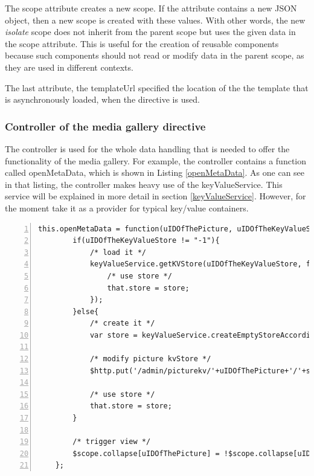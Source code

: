 The scope attribute creates a new scope. If the attribute contains a new \ac{JSON} object, then a new scope is created with these values. With other words, the new \emph{isolate} scope does not inherit from the parent scope but uses the given data in the scope attribute. This is useful for the creation of reusable components because such components should not  read or modify data in the parent scope, as they are used in different contexts. 

The last attribute, the templateUrl specified the location of the the template that is asynchronously loaded, when the directive is used.

\subsubsection{Controller of the media gallery directive}
The controller is used for the whole data handling that is needed to offer the functionality of the media gallery. For example, the controller contains a function called openMetaData, which is shown in Listing \ref{openMetaData}. As one can see in that listing, the controller makes heavy use of the keyValueService. This service will be explained in more detail in section \ref{keyValueService}. However, for the moment take it as a provider for typical key/value containers.

\begin{lstlisting}[numbers=left,caption={The listing shows the openMetaData function},label=openMetaData,frame=tlbr,breaklines]
    this.openMetaData = function(uIDOfThePicture, uIDOfTheKeyValueStore){
        if(uIDOfTheKeyValueStore != "-1"){
            /* load it */
            keyValueService.getKVStore(uIDOfTheKeyValueStore, function(store){
                /* use store */
                that.store = store;
            });
        }else{
            /* create it */
            var store = keyValueService.createEmptyStoreAccordingToType('img');

            /* modify picture kvStore */
            $http.put('/admin/picturekv/'+uIDOfThePicture+'/'+store.uID);

            /* use store */
            that.store = store;
        }

        /* trigger view */
        $scope.collapse[uIDOfThePicture] = !$scope.collapse[uIDOfThePicture];
    };
\end{lstlisting}

